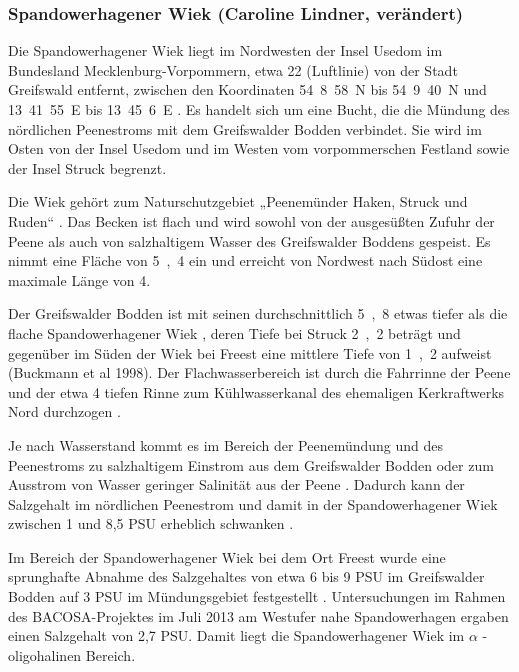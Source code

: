 \subsubsection{Spandowerhagener Wiek (Caroline Lindner, verändert)}

Die Spandowerhagener Wiek liegt im Nordwesten der Insel Usedom im Bundesland Mecklenburg-Vorpommern, etwa \unit{22}{\kilo\metre} (Luftlinie) von der Stadt Greifswald entfernt, zwischen den Koordinaten 54\textdegree\ 8\textquotesingle\ 58\dq\ N bis 54\textdegree\ 9\textquotesingle\ 40\dq\ N und 13\textdegree\ 41\textquotesingle\ 55\dq\ E bis 13\textdegree\ 45\textquotesingle\ 6\dq\ E \citep{nathansen_2014}. 
Es handelt sich um eine Bucht, die die Mündung des nördlichen Peenestroms mit dem Greifswalder Bodden verbindet. Sie wird im Osten von der Insel Usedom und im Westen vom vorpommerschen Festland sowie der Insel Struck begrenzt. 

Die Wiek gehört zum Naturschutzgebiet „Peenemünder Haken, Struck und Ruden“ \citep{niedermeyer_2011}.
Das Becken ist flach und wird sowohl von der ausgesüßten Zufuhr der Peene als auch von salzhaltigem Wasser des Greifswalder Boddens gespeist. Es nimmt eine Fläche von \unit{5,4}{\kilo\metre\squared} ein \citep{niedermeyer_2011} und erreicht von Nordwest nach Südost eine maximale Länge von \unit{4}{\kilo\metre}.

Der Greifswalder Bodden ist mit seinen durchschnittlich \unit{5,8}{\metre} etwas tiefer als die flache Spandowerhagener Wiek \citep{meyer_1998}, deren Tiefe bei Struck \unit{2,2}{\metre} beträgt \citep{bartels_1998} und gegenüber im Süden der Wiek bei Freest eine mittlere Tiefe von \unit{1,2}{\metre} aufweist (Buckmann et al 1998). Der Flachwasserbereich ist durch die Fahrrinne der Peene und der etwa \unit{4}{\metre} tiefen Rinne zum Kühlwasserkanal des ehemaligen Kerkraftwerks Nord durchzogen \citep{gosselck_2007}.

Je nach Wasserstand kommt es im Bereich der Peenemündung und des Peenestroms zu salzhaltigem Einstrom aus dem Greifswalder Bodden oder zum Ausstrom von Wasser geringer Salinität aus der Peene \citep{buckmann_1998}. Dadurch kann der Salzgehalt im nördlichen Peenestrom und damit in der Spandowerhagener Wiek zwischen 1 und 8,5 PSU erheblich schwanken \citep{meyer_1998}.

Im Bereich der Spandowerhagener Wiek bei dem Ort Freest wurde eine sprunghafte Abnahme des Salzgehaltes von etwa 6 bis 9 PSU im Greifswalder Bodden auf 3 PSU im Mündungsgebiet festgestellt \citep{gunther_1998}. Untersuchungen im Rahmen des BACOSA-Projektes im Juli 2013 am Westufer nahe Spandowerhagen ergaben einen Salzgehalt von 2,7 PSU. Damit liegt die Spandowerhagener Wiek im $\alpha$ - oligohalinen Bereich.



